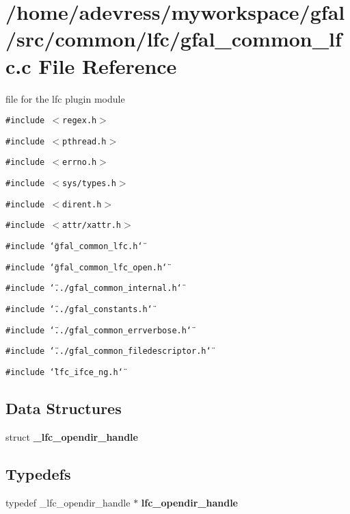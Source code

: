 \section{/home/adevress/myworkspace/gfal/src/common/lfc/gfal\_\-common\_\-lfc.c File Reference}
\label{gfal__common__lfc_8c}
file for the lfc plugin module 

{\tt \#include $<$regex.h$>$}\par
{\tt \#include $<$pthread.h$>$}\par
{\tt \#include $<$errno.h$>$}\par
{\tt \#include $<$sys/types.h$>$}\par
{\tt \#include $<$dirent.h$>$}\par
{\tt \#include $<$attr/xattr.h$>$}\par
{\tt \#include \char`\"{}gfal\_\-common\_\-lfc.h\char`\"{}}\par
{\tt \#include \char`\"{}gfal\_\-common\_\-lfc\_\-open.h\char`\"{}}\par
{\tt \#include \char`\"{}../gfal\_\-common\_\-internal.h\char`\"{}}\par
{\tt \#include \char`\"{}../gfal\_\-constants.h\char`\"{}}\par
{\tt \#include \char`\"{}../gfal\_\-common\_\-errverbose.h\char`\"{}}\par
{\tt \#include \char`\"{}../gfal\_\-common\_\-filedescriptor.h\char`\"{}}\par
{\tt \#include \char`\"{}lfc\_\-ifce\_\-ng.h\char`\"{}}\par
\subsection*{Data Structures}
\begin{CompactItemize}
\item 
struct \textbf{\_\-lfc\_\-opendir\_\-handle}
\end{CompactItemize}
\subsection*{Typedefs}
\begin{CompactItemize}
\item 
typedef \_\-lfc\_\-opendir\_\-handle $\ast$ \textbf{lfc\_\-opendir\_\-handle}\label{gfal__common__lfc_8c_5cac68b08f5b09ea46c43428e0fc2cc2}

\end{CompactItemize}
